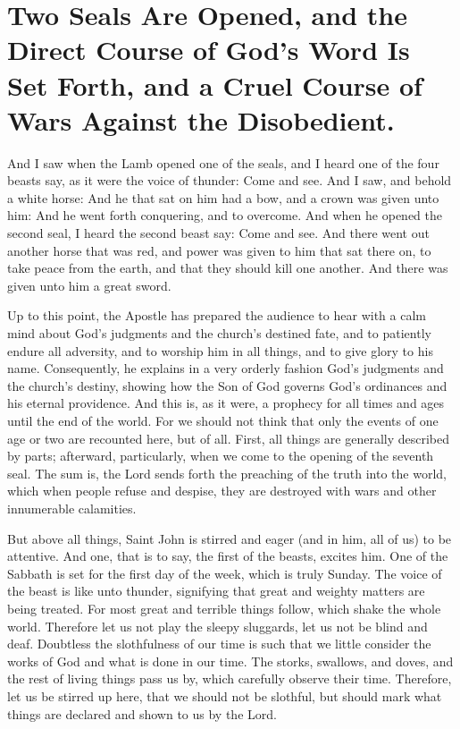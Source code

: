 \chapter[Sermon 30. Two Seals Are Opened, and the Direct Course of God's Word Is Set Forth, and a Cruel Course of Wars Against the Disobedient.]{Two Seals Are Opened, and the Direct Course of God's Word Is Set Forth, and a Cruel Course of Wars Against the Disobedient.}
\label{sermon:030}

And I saw when the Lamb opened one of the seals, and I heard one of the four beasts say, as it were the voice of thunder: Come and see. And I saw, and behold a white horse: And he that sat on him had a bow, and a crown was given unto him: And he went forth conquering, and to overcome. And when he opened the second seal, I heard the second beast say: Come and see. And there went out another horse that was red, and power was given to him that sat there on, to take peace from the earth, and that they should kill one another. And there was given unto him a great sword.

Up to this point, the Apostle has prepared the audience to hear with a calm mind about God’s judgments and the church’s destined fate, and to patiently endure all adversity, and to worship him in all things, and to give glory to his name. Consequently, he explains in a very orderly fashion God’s judgments and the church’s destiny, showing how the Son of God governs God’s ordinances and his eternal providence. And this is, as it were, a prophecy for all times and ages until the end of the world. For we should not think that only the events of one age or two are recounted here, but of all. First, all things are generally described by parts; afterward, particularly, when we come to the opening of the seventh seal. The sum is, the Lord sends forth the preaching of the truth into the world, which when people refuse and despise, they are destroyed with wars and other innumerable calamities.

But above all things, Saint John is stirred and eager (and in him, all of us) to be attentive. And one, that is to say, the first of the beasts, excites him. One of the Sabbath is set for the first day of the week, which is truly Sunday. The voice of the beast is like unto thunder, signifying that great and weighty matters are being treated. For most great and terrible things follow, which shake the whole world. Therefore let us not play the sleepy sluggards, let us not be blind and deaf. Doubtless the slothfulness of our time is such that we little consider the works of God and what is done in our time. The storks, swallows, and doves, and the rest of living things pass us by, which carefully observe their time. Therefore, let us be stirred up here, that we should not be slothful, but should mark what things are declared and shown to us by the Lord.

